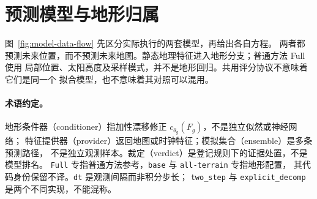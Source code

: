 \section{预测模型与地形归属}
\label{sec:models}\hypertarget{sec:models}{}
图~\ref{fig:model-data-flow} 先区分实际执行的两套模型，再给出各自方程。
两者都预测未来位置，而不预测未来地图。静态地理特征进入地形分支；普通方法 Full 使用
局部位置、太阳高度及采样模式，并不是地形回归。共用评分协议不意味着它们是同一个
拟合模型，也不意味着其对照可以混用。
\begin{samepage}
\paragraph{术语约定。}
地形条件器（conditioner）指加性漂移修正 \(c_{\theta_g}(F_g)\)，不是独立似然或神经网络；
特征提供器（provider）返回地图或时钟特征；模拟集合（ensemble）是多条预测路径，
不是独立观测样本。裁定（verdict）是登记规则下的证据处置，不是模型排名。
\texttt{Full} 专指普通方法参考，\texttt{base} 与 \texttt{all-terrain} 专指地形配置，
其代码身份保留不译。\texttt{dt} 是观测间隔而非积分步长；
\texttt{two\_step} 与 \texttt{explicit\_decomp} 是两个不同实现，不能混称。
\par
\end{samepage}

